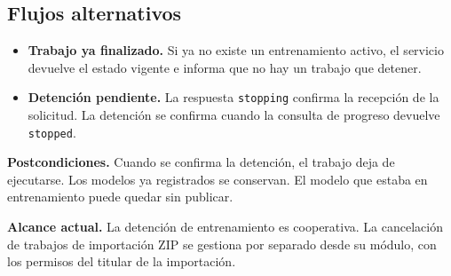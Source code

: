 \subsection*{Flujos alternativos}

\begin{itemize}
    \item \textbf{Trabajo ya finalizado.} Si ya no existe un
    entrenamiento activo, el servicio devuelve el estado vigente e
    informa que no hay un trabajo que detener.
    \item \textbf{Detención pendiente.} La respuesta \texttt{stopping}
    confirma la recepción de la solicitud. La detención se confirma
    cuando la consulta de progreso devuelve \texttt{stopped}.
\end{itemize}

\noindent\textbf{Postcondiciones.} Cuando se confirma la detención, el
trabajo deja de ejecutarse. Los modelos ya registrados se conservan.
El modelo que estaba en entrenamiento puede quedar sin publicar.

\noindent\textbf{Alcance actual.} La detención de entrenamiento es
cooperativa. La cancelación de trabajos de importación ZIP se gestiona
por separado desde su módulo, con los permisos del titular de la
importación.

